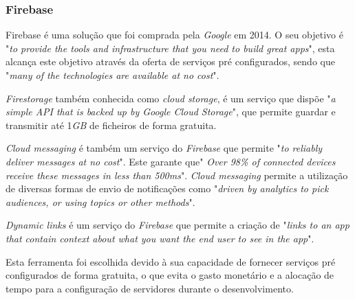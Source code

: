\subsubsection{Firebase}
Firebase é uma solução que foi comprada pela \textit{Google} em 2014. O seu objetivo é "\emph{to provide the tools and infrastructure that you need to build great apps}"\citep{Moroney2017}, esta alcança este objetivo através da oferta de serviços pré configurados, sendo que "\emph{many of the technologies are available at no cost}"\citep{Moroney2017}.

\textit{Firestorage} também conhecida como \textit{cloud storage}, é um serviço que dispõe "\emph{a simple API that is backed up by Google Cloud Storage}"\citep{Moroney2017}, que permite guardar e transmitir até 1\textit{GB} de ficheiros de forma gratuita.

\textit{Cloud messaging} é também um serviço do \textit{Firebase} que permite "\emph{to reliably deliver messages at no cost}"\citep{Moroney2017}. Este garante que" \emph{Over 98\% of connected devices receive these messages in less than 500ms}"\citep{Moroney2017}. \textit{Cloud messaging} permite a utilização de diversas formas de envio de notificações como "\emph{driven by analytics to pick audiences, or using topics or other methods}"\citep{Moroney2017}.

\textit{Dynamic links} é um serviço do \textit{Firebase} que permite a criação de "\emph{links to an app that contain context about what you want the end user to see in the app}"\citep{Moroney2017}.

Esta ferramenta foi escolhida devido à sua capacidade de fornecer serviços pré configurados de forma gratuita, o que evita o gasto monetário e a alocação de tempo para a configuração de servidores durante o desenvolvimento.